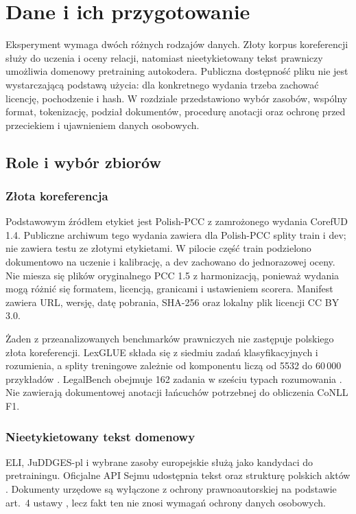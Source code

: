 \chapter{Dane i ich przygotowanie}
\label{chap:dane}

Eksperyment wymaga dwóch różnych rodzajów danych. Złoty korpus koreferencji służy do uczenia i oceny relacji, natomiast nieetykietowany tekst prawniczy umożliwia domenowy pretraining autokodera. Publiczna dostępność pliku nie jest wystarczającą podstawą użycia: dla konkretnego wydania trzeba zachować licencję, pochodzenie i hash. W rozdziale przedstawiono wybór zasobów, wspólny format, tokenizację, podział dokumentów, procedurę anotacji oraz ochronę przed przeciekiem i ujawnieniem danych osobowych.

\section{Role i wybór zbiorów}
\label{sec:role-zbiorow}

\subsection{Złota koreferencja}

Podstawowym źródłem etykiet jest Polish-PCC z zamrożonego wydania CorefUD 1.4. Publiczne archiwum tego wydania zawiera dla Polish-PCC splity train i dev; nie zawiera testu ze złotymi etykietami. W pilocie część train podzielono dokumentowo na uczenie i kalibrację, a dev zachowano do jednorazowej oceny. Nie miesza się plików oryginalnego PCC 1.5 z harmonizacją, ponieważ wydania mogą różnić się formatem, licencją, granicami i ustawieniem scorera. Manifest zawiera URL, wersję, datę pobrania, SHA-256 oraz lokalny plik licencji CC BY 3.0.

Żaden z przeanalizowanych benchmarków prawniczych nie zastępuje polskiego złota koreferencji. LexGLUE składa się z siedmiu zadań klasyfikacyjnych i rozumienia, a splity treningowe zależnie od komponentu liczą od 5532 do 60\,000 przykładów \cite{chalkidis_2022_lexglue}. LegalBench obejmuje 162 zadania w sześciu typach rozumowania \cite{guha_2023_legalbench}. Nie zawierają dokumentowej anotacji łańcuchów potrzebnej do obliczenia CoNLL F1.

\subsection{Nieetykietowany tekst domenowy}

ELI, JuDDGES-pl i wybrane zasoby europejskie służą jako kandydaci do pretrainingu. Oficjalne API Sejmu udostępnia tekst oraz strukturę polskich aktów \cite{sejm_2026_eli}. Dokumenty urzędowe są wyłączone z ochrony prawnoautorskiej na podstawie art.~4 ustawy \cite{sejm_1994_prawo_autorskie}, lecz fakt ten nie znosi wymagań ochrony danych osobowych.

